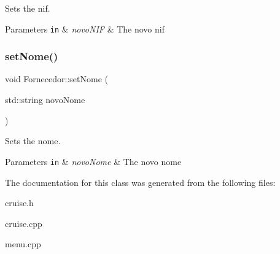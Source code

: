 Sets the nif. 


\begin{DoxyParams}[1]{Parameters}
\mbox{\tt in}  & {\em novo\+N\+IF} & The novo nif \\
\hline
\end{DoxyParams}
\mbox{\label{classFornecedor_a2f207b2242cf6ec5d76a3808dbb4fd80}} 
\subsubsection{\texorpdfstring{set\+Nome()}{setNome()}}
{\footnotesize\ttfamily void Fornecedor\+::set\+Nome (\begin{DoxyParamCaption}\item[{std\+::string}]{novo\+Nome }\end{DoxyParamCaption})\hspace{0.3cm}{\ttfamily [inline]}}



Sets the nome. 


\begin{DoxyParams}[1]{Parameters}
\mbox{\tt in}  & {\em novo\+Nome} & The novo nome \\
\hline
\end{DoxyParams}


The documentation for this class was generated from the following files\+:\begin{DoxyCompactItemize}
\item 
cruise.\+h\item 
cruise.\+cpp\item 
menu.\+cpp\end{DoxyCompactItemize}
